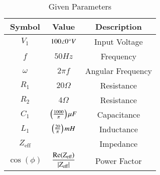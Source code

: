 \begin{table}[!h]
    \centering
    \begin{tabular}{|c|c|c|}
    \hline
       \textbf{Symbol}  & \textbf{Value}  & \textbf{Description}\\
    \hline
       $V_1$  & $100\angle0\degree V$ & Input Voltage \\
    \hline
        $f$ & $50Hz$ & Frequency\\
    \hline
        $\omega$ & $2\pi f$ & Angular Frequency\\
    \hline
        $R_1$ & $20\Omega$ & Resistance\\
    \hline
        $R_2$ & $4\Omega$ & Resistance\\
    \hline
        $C_1$ & $\left(\frac{1000}{\pi}\right)\mu F$ & Capacitance\\
    \hline
        $L_1$ & $\left(\frac{20}{\pi}\right)mH$ & Inductance\\
    \hline
        $Z_{\text{eff}}$ & & Impedance\\
    \hline
        $\cos(\phi)$ & $\dfrac{\mathrm{Re}(Z_{\text{eff}})}{\left\vert Z_{\text{eff}}\right\vert}$& Power Factor\\
    \hline
    \end{tabular}
    \caption{Given Parameters}
    \label{tab:1_gate.22.in.52}
\end{table}
